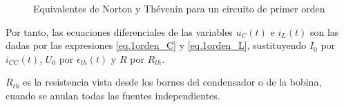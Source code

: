 \begin{figure}[H]
  \centering {}\hfil
  \caption{Equivalentes de Norton y Thévenin para un circuito de
    primer orden}
  \label{fig.thevenin_1orden}
\end{figure}
Por tanto, las ecuaciones diferenciales de las variables $u_C(t)$ e
$i_L(t)$ son las dadas por las expresiones \eqref{eq.1orden_C} y
\eqref{eq.1orden_L}, sustituyendo $I_0$ por $i_{CC}(t)$, $U_0$ por
$\epsilon_{th}(t)$ y $R$ por $R_{th}$.
	
\begin{remark}
  $R_{th}$ es la resistencia vista desde los bornes del condensador o
  de la bobina, cuando se anulan todas las fuentes independientes.
\end{remark}
	
